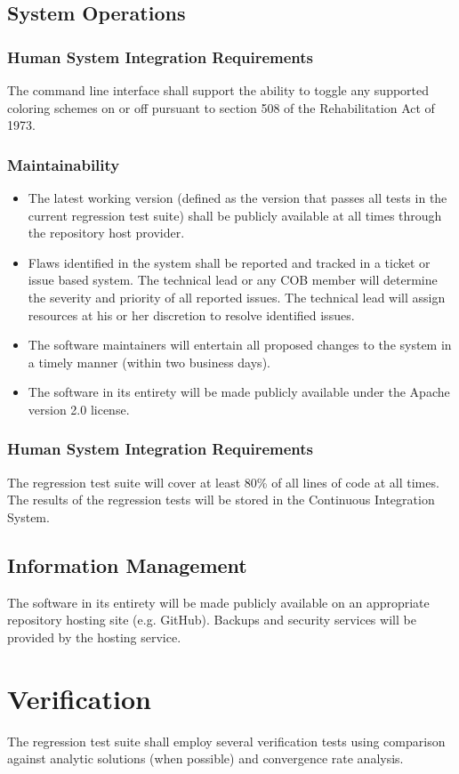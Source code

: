 \subsection{System Operations}
\subsubsection{Human System Integration Requirements}
The command line interface shall support the ability to toggle any supported coloring schemes on or off pursuant to section 
508 of the Rehabilitation Act of 1973.
\subsubsection{Maintainability}
\begin{itemize}
  \item The latest working version (defined as the version that passes all tests in the current regression test suite) shall be 
           publicly available at all times through the repository host provider.
  \item  Flaws identified in the system shall be reported and tracked in a ticket or issue based system. The technical lead or 
            any COB member will 
            determine the severity and priority of all reported issues. The technical lead will assign resources at his or her 
            discretion to resolve identified issues.
  \item  The software maintainers will entertain all proposed changes to the system in a timely manner 
           (within two business days).        
  \item  The software in its entirety will be made publicly available under the Apache version 2.0 license.     
\end{itemize}
\subsubsection{Human System Integration Requirements}
The regression test suite will cover at least 80\% of all lines of code at all times. 
The results of the regression tests will be stored in the Continuous Integration System.

\subsection{Information Management}
The software in its entirety will be made publicly available on an appropriate repository hosting site (e.g. GitHub).
Backups and security services will be provided by the hosting service.

\section{Verification}
The regression test suite shall employ several verification tests using comparison against analytic 
solutions (when possible) and convergence rate analysis. 
